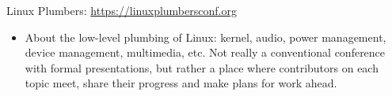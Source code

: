 \item Linux Plumbers: \url{https://linuxplumbersconf.org}
  \begin{itemize}
  \item About the low-level plumbing of Linux: kernel,
    audio, power management, device management, multimedia, etc.
    Not really a conventional conference with formal presentations,
    but rather a place where contributors on each topic meet, share their progress and make
    plans for work ahead.
  \end{itemize}
